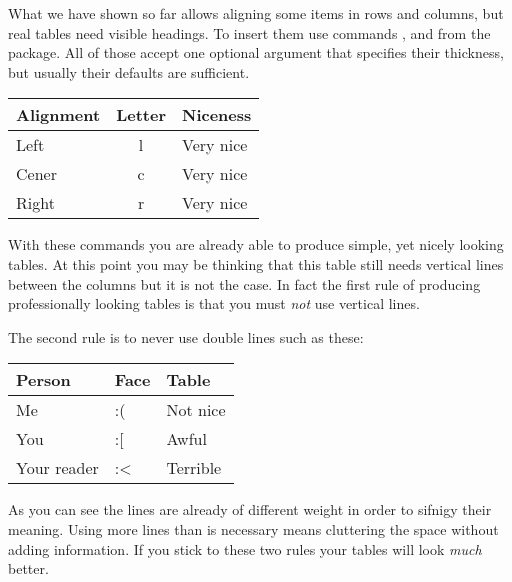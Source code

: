 What we have shown so far allows aligning some items in rows and columns,
but real tables need visible headings. To insert them use commands
,  and  from the  package.
All of those accept one optional argument that specifies their thickness, but
usually their defaults are sufficient.
\begin{example}[examplewidth=0.43\linewidth]
\begin{tabular}{lcl}
  \toprule
  Alignment & Letter & Niceness  \\
  \midrule
  Left      & l      & Very nice \\
  Cener     & c      & Very nice \\
  Right     & r      & Very nice \\
  \bottomrule
\end{tabular}
\end{example}

With these commands you are already able to produce simple, yet nicely looking
tables. At this point you may be thinking that this table still needs vertical
lines between the columns but it is not the case. In fact the first rule of
producing professionally looking tables is that you must \emph{not} use
vertical lines.

The second rule is to never use double lines such as these:
\begin{example}[examplewidth=0.43\linewidth]
\begin{tabular}{lll}
  \toprule[0.1cm]
  \toprule
  Person      & Face & Table    \\
  \midrule
  \midrule
  Me          & :(   & Not nice \\
  You         & :[   & Awful    \\
  Your reader & :<   & Terrible \\
  \bottomrule
  \bottomrule[0.1cm]
\end{tabular}
\end{example}
As you can see the lines are already of different weight in order to sifnigy
their meaning. Using more lines than is necessary means cluttering the space
without adding information. If you stick to these two rules your tables will
look \emph{much} better.

